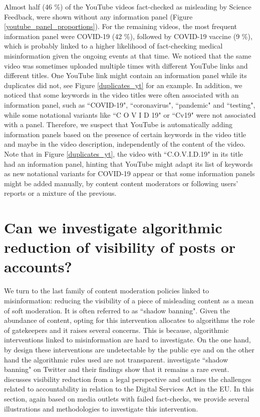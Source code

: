 \documentclass[Afour,sageh,times]{sagej}
\begin{document}
\smallskip

Almost half (46 \%) of the YouTube videos fact-checked as misleading by Science Feedback, were shown without any information panel (Figure \ref{youtube_panel_proportions}).
For the remaining videos, the most frequent information panel were COVID-19 (42 \%), followed by COVID-19 vaccine (9 \%), which is probably linked to a higher likelihood of fact-checking medical misinformation given the ongoing events at that time.
We noticed that the same video was sometimes uploaded multiple times with different YouTube links and different titles. 
One YouTube link might contain an information panel while its duplicates did not, see Figure \ref{duplicates_yt} for an example.  
In addition, we noticed that some keywords in the video titles were often associated with an information panel, such as ``COVID-19", ``coronavirus", ``pandemic" and ``testing", while some notational variants like ``C O V I D 19" or ``Cv19" were not associated with a panel.
Therefore, we suspect that YouTube is automatically adding information panels based on the presence of certain keywords in the video title and maybe in the video description, independently of the content of the video.
Note that in Figure \ref{duplicates_yt}, the video with ``C.O.V.I.D.19" in its title had an information panel, hinting that YouTube might adapt its list of keywords as new notational variants for COVID-19 appear or that some information panels might be added manually, by content content moderators or following users' reports or a mixture of the previous.


\section{Can we investigate algorithmic reduction of visibility of posts or accounts?}
We turn to the last family of content moderation policies linked to misinformation: reducing the visibility of a piece of misleading content as a mean of soft moderation. It is often referred to as ``shadow banning". Given the abundance of content, opting for this intervention allocates to algorithms the role of gatekeepers and it raises several concerns. This is because,  algorithmic interventions linked to misinformation are hard to investigate. On the one hand, by design these interventions are undetectable by the public eye and on the other hand the algorithmic rules used are not transparent. \cite{kokil2023silenced} investigate ``shadow banning" on Twitter and their findings show that it remains a rare event. \cite{LEERSSEN2023105790} discusses visibility reduction from a legal perspective and outlines the challenges related to accountability in relation to the Digital Services Act in the EU. In this section, again based on media outlets with failed fact-checks, we provide several illustrations and methodologies to investigate this intervention. 
\end{document}

